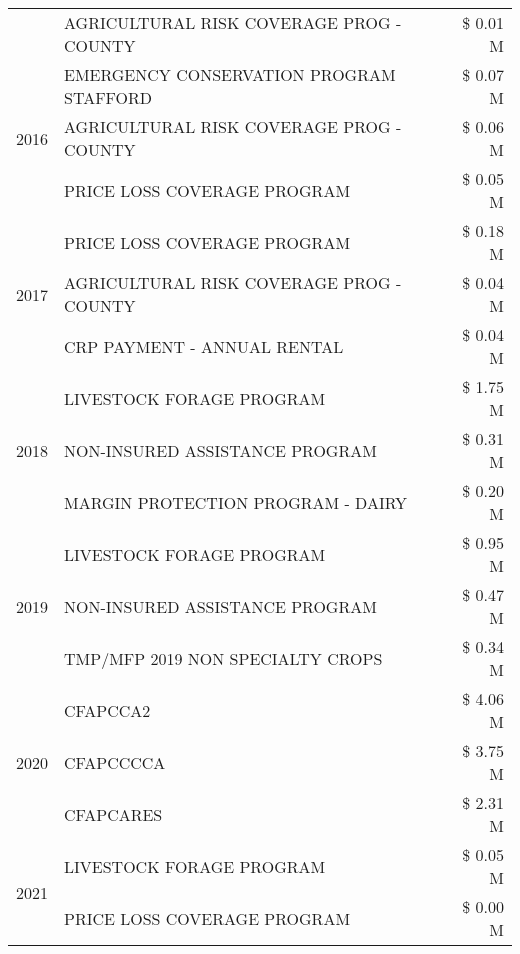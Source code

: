 \begin{tabular}{llr}
 & AGRICULTURAL RISK COVERAGE PROG - COUNTY & \$ 0.01 M \\
\cline{1-3}
\multirow[t]{3}{*}{2016} & EMERGENCY CONSERVATION PROGRAM STAFFORD & \$ 0.07 M \\
 & AGRICULTURAL RISK COVERAGE PROG - COUNTY & \$ 0.06 M \\
 & PRICE LOSS COVERAGE PROGRAM & \$ 0.05 M \\
\cline{1-3}
\multirow[t]{3}{*}{2017} & PRICE LOSS COVERAGE PROGRAM & \$ 0.18 M \\
 & AGRICULTURAL RISK COVERAGE PROG - COUNTY & \$ 0.04 M \\
 & CRP PAYMENT - ANNUAL RENTAL & \$ 0.04 M \\
\cline{1-3}
\multirow[t]{3}{*}{2018} & LIVESTOCK FORAGE PROGRAM & \$ 1.75 M \\
 & NON-INSURED ASSISTANCE PROGRAM & \$ 0.31 M \\
 & MARGIN PROTECTION PROGRAM - DAIRY & \$ 0.20 M \\
\cline{1-3}
\multirow[t]{3}{*}{2019} & LIVESTOCK FORAGE PROGRAM & \$ 0.95 M \\
 & NON-INSURED ASSISTANCE PROGRAM & \$ 0.47 M \\
 & TMP/MFP 2019 NON SPECIALTY CROPS & \$ 0.34 M \\
\cline{1-3}
\multirow[t]{3}{*}{2020} & CFAPCCA2 & \$ 4.06 M \\
 & CFAPCCCCA & \$ 3.75 M \\
 & CFAPCARES & \$ 2.31 M \\
\cline{1-3}
\multirow[t]{2}{*}{2021} & LIVESTOCK FORAGE PROGRAM & \$ 0.05 M \\
 & PRICE LOSS COVERAGE PROGRAM & \$ 0.00 M \\
\cline{1-3}
\bottomrule
\end{tabular}
